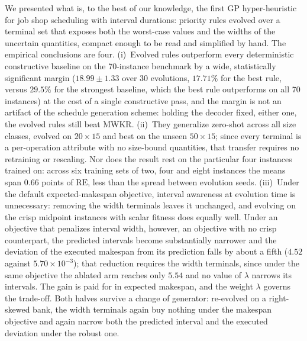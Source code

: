 \documentclass[review,authoryear,11pt]{elsarticle}
\newcommand{\rev}[1]{\textcolor{revcolor}{#1}}
\newcommand{\RE}{\mathrm{RE}}
\begin{document}
We presented what is, to the best of our knowledge, the first GP
hyper-heuristic for job shop scheduling with interval durations:
priority rules evolved over a terminal set that exposes both the
worst-case values and the widths of the uncertain quantities, compact
enough to be read and simplified by hand. The empirical conclusions are
\rev{four}. (i)~Evolved rules outperform every
deterministic constructive baseline on the 70-instance benchmark by a
wide, statistically significant margin ($18.99 \pm 1.33$ over 30
evolutions, $17.71\%$ for the best rule, versus $29.5\%$ for the
strongest baseline, which the best rule outperforms on all 70 instances) at
the cost of a single constructive pass\rev{, and the margin is not an
artifact of the schedule generation scheme: holding the decoder fixed,
either one, the evolved rules still beat MWKR}. (ii)~They
generalize zero-shot across all size classes, evolved on
$20{\times}15$ and best on the unseen $50{\times}15$; since every
terminal is a per-operation attribute with no size-bound quantities,
that transfer requires no retraining or rescaling\rev{. Nor does the
result rest on the particular four instances trained on: across six
training sets of two, four and eight instances the means span $0.66$
points of $\RE$, less than the spread between evolution seeds}.
(iii)~\rev{Under the default expected-makespan objective}, interval
awareness at evolution time is
unnecessary: removing the width terminals leaves it unchanged, and
evolving on the crisp midpoint instances with scalar fitness does
equally well. Under an objective that penalizes interval width, however,
an objective with no crisp counterpart, the predicted intervals become
substantially narrower and the deviation of the executed makespan from its prediction
falls by about a fifth ($4.52$ against $5.70 \times 10^{-3}$); that
reduction requires the width terminals, since under the same objective
the ablated arm reaches only $5.54$ and no value of $\lambda$ narrows its
intervals. The gain is paid for in expected
makespan, and the weight $\lambda$ governs the trade-off.
\rev{Both halves survive a change of generator: re-evolved on a
right-skewed bank, the width terminals again buy nothing under the
makespan objective and again narrow both the predicted interval and the
executed deviation under the robust one.}
\end{document}
